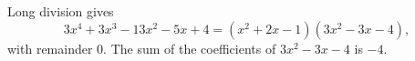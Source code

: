 Long division gives
\[3x^4+3x^3-13x^2-5x+4=\left(x^2+2x-1\right)\left(3x^2-3x-4\right),\]
with remainder $0$. The sum of the coefficients of $3x^2-3x-4$ is $\boxed{-4}$.
